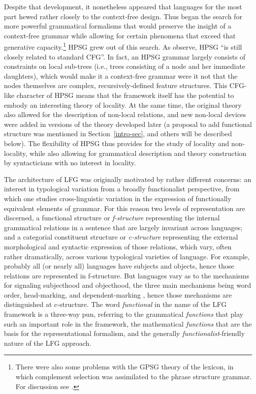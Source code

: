 Despite that development, it nonetheless appeared that languages for the most part hewed rather closely to the context-free design.  Thus began the search for more powerful grammatical formalisms that would preserve the insight of a context-free grammar while allowing for certain phenomena that exceed that generative capacity.\footnote{There were also some problems with the GPSG theory of the lexicon, in which complement selection was assimilated to the phrase structure grammar.  For discussion see \citet[Section~4.1]{MWArgSt}.}  HPSG grew out of this search. As  \citet[83]{SWB2003a} observe, HPSG ``is still  closely related to standard CFG''.  In fact, an HPSG grammar largely consists of constraints on local sub-trees (i.e., trees consisting of a node and her immediate daughters), which would make it a context-free grammar were it not that the nodes themselves are complex, recursively-defined feature structures.   This CFG-like character of HPSG means that the framework itself has the potential to embody an interesting theory of locality.   At the same time, the original theory also allowed for the description of non-local relations, and new non-local devices were added in versions of the theory developed later (a proposal to add functional structure was mentioned in Section~\ref{intro-sec}, and others will be described below).  The flexibility of HPSG thus provides for the study of locality and non-locality, while also allowing for grammatical description and theory construction by syntacticians with no interest in locality.  

The architecture of LFG was originally motivated by rather different concerns:  an interest in typological variation from a broadly functionalist perspective, from which one studies cross-linguistic variation in the expression of functionally equivalent elements of grammar.
For this reason two levels of representation are discerned, a functional structure or \textit{f-structure} representing the internal grammatical relations in a sentence that are largely invariant across languages; and a categorial constituent structure or \textit{c-structure} representing the external morphological and syntactic expression of those relations, which vary, often rather dramatically, across various typological varieties of language.  For example, probably all (or nearly all) languages have subjects and objects, hence those relations are represented in f-structure.  But languages vary as to the mechanisms for signaling subjecthood and objecthood,  the three main mechanisms being word order, head-marking, and dependent-marking \citep{Nichols86a-u}, hence those mechanisms are distinguished at c-structure.    The word \textit{functional} in the name of the LFG framework  is a three-way pun, referring to the grammatical \textit{functions} that play such an important role in the framework, the mathematical \textit{functions} that are the basis for the representational formalism, and the generally \textit{functionalist}-friendly nature of the LFG approach.  

